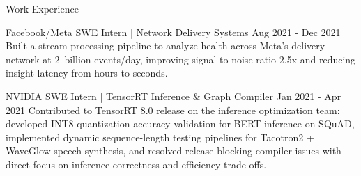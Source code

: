 \documentclass{resume} %
\begin{document}
\begin{rSection}{Work Experience}
    \begin{workexperience}
        {Facebook/Meta}
        {SWE Intern | Network Delivery Systems}
        {Aug 2021 - Dec 2021}
        {
            Built a stream processing pipeline to analyze health across Meta's delivery network at 2~billion events/day, improving signal-to-noise ratio 2.5x and reducing insight latency from hours to seconds.
        }
    \end{workexperience}

    \begin{workexperience}
        {NVIDIA}
        {SWE Intern | TensorRT Inference \& Graph Compiler}
        {Jan 2021 - Apr 2021}
        {
            Contributed to TensorRT 8.0 release on the inference optimization team: developed INT8 quantization accuracy validation for BERT inference on SQuAD, implemented dynamic sequence-length testing pipelines for Tacotron2 + WaveGlow speech synthesis, and resolved release-blocking compiler issues with direct focus on inference correctness and efficiency trade-offs.
        }
    \end{workexperience}

\end{rSection}
\end{document}
